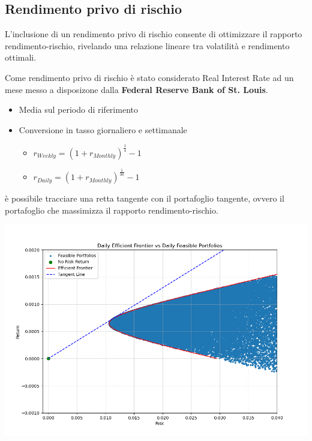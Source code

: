 \documentclass[compress]{beamer}
\begin{document}
\subsection{Rendimento privo di rischio}
\begin{frame}{\subsecname}
	L'inclusione di un rendimento privo di rischio consente di ottimizzare il rapporto rendimento-rischio, rivelando una relazione lineare tra volatilità e rendimento ottimali. 

	Come rendimento privo di rischio è stato considerato Real Interest Rate ad un mese messo a disposizone dalla \textbf{Federal Reserve Bank of St. Louis}. 

	\begin{itemize}
		\item Media sul periodo di riferimento
		\item Conversione in tasso giornaliero e settimanale
		\begin{itemize}
			\item \( r_{Weekly} = (1 + r_{Monthly})^\frac{1}{4} - 1 \)
			\item \( r_{Daily} = (1 + r_{Monthly})^\frac{1}{30} - 1 \)
		\end{itemize}
	\end{itemize}
\end{frame}

\begin{frame}{\subsecname}
	è possibile tracciare una retta tangente con il portafoglio tangente, ovvero il portafoglio che massimizza il rapporto rendimento-rischio. \\
	\vspace{-0.6cm}
	\begin{center}
		\begin{minipage}{0.8\textwidth}
			\centering
			\includegraphics[width=1\linewidth]{images/Daily Efficient Frontier vs Daily Feasible Portfolios.png}
		\end{minipage}
	\end{center}
\end{frame}
\end{document}
